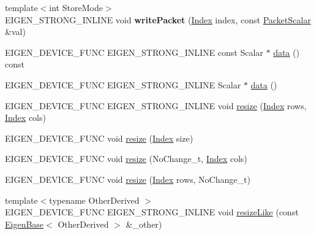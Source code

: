 \begin{DoxyCompactItemize}
\item 
\mbox{\label{class_eigen_1_1_plain_object_base_acda1c761dd92774f7835a0c661f2ef54}} 
{\footnotesize template$<$int Store\+Mode$>$ }\\E\+I\+G\+E\+N\+\_\+\+S\+T\+R\+O\+N\+G\+\_\+\+I\+N\+L\+I\+NE void {\bfseries write\+Packet} (\hyperlink{namespace_eigen_a62e77e0933482dafde8fe197d9a2cfde}{Index} index, const \hyperlink{group___sparse_core___module}{Packet\+Scalar} \&val)
\item 
E\+I\+G\+E\+N\+\_\+\+D\+E\+V\+I\+C\+E\+\_\+\+F\+U\+NC E\+I\+G\+E\+N\+\_\+\+S\+T\+R\+O\+N\+G\+\_\+\+I\+N\+L\+I\+NE const Scalar $\ast$ \hyperlink{class_eigen_1_1_plain_object_base_ac25699535374b1854cf8494e44ad31b2}{data} () const
\item 
E\+I\+G\+E\+N\+\_\+\+D\+E\+V\+I\+C\+E\+\_\+\+F\+U\+NC E\+I\+G\+E\+N\+\_\+\+S\+T\+R\+O\+N\+G\+\_\+\+I\+N\+L\+I\+NE Scalar $\ast$ \hyperlink{class_eigen_1_1_plain_object_base_a54ed64f45b2f5e852355d5e2311810bd}{data} ()
\item 
E\+I\+G\+E\+N\+\_\+\+D\+E\+V\+I\+C\+E\+\_\+\+F\+U\+NC E\+I\+G\+E\+N\+\_\+\+S\+T\+R\+O\+N\+G\+\_\+\+I\+N\+L\+I\+NE void \hyperlink{class_eigen_1_1_plain_object_base_a99d9054ee2d5a40c6e00ded0265e9cea}{resize} (\hyperlink{namespace_eigen_a62e77e0933482dafde8fe197d9a2cfde}{Index} rows, \hyperlink{namespace_eigen_a62e77e0933482dafde8fe197d9a2cfde}{Index} cols)
\item 
E\+I\+G\+E\+N\+\_\+\+D\+E\+V\+I\+C\+E\+\_\+\+F\+U\+NC void \hyperlink{class_eigen_1_1_plain_object_base_abf8a9ec07cd52a2cdabb527596f7ddd1}{resize} (\hyperlink{namespace_eigen_a62e77e0933482dafde8fe197d9a2cfde}{Index} size)
\item 
E\+I\+G\+E\+N\+\_\+\+D\+E\+V\+I\+C\+E\+\_\+\+F\+U\+NC void \hyperlink{class_eigen_1_1_plain_object_base_ab71a655f73d05a0e389e3ed13b6fe5f3}{resize} (No\+Change\+\_\+t, \hyperlink{namespace_eigen_a62e77e0933482dafde8fe197d9a2cfde}{Index} cols)
\item 
E\+I\+G\+E\+N\+\_\+\+D\+E\+V\+I\+C\+E\+\_\+\+F\+U\+NC void \hyperlink{class_eigen_1_1_plain_object_base_a7b44761b7350ae3756035bbf7d7c04f6}{resize} (\hyperlink{namespace_eigen_a62e77e0933482dafde8fe197d9a2cfde}{Index} rows, No\+Change\+\_\+t)
\item 
{\footnotesize template$<$typename Other\+Derived $>$ }\\E\+I\+G\+E\+N\+\_\+\+D\+E\+V\+I\+C\+E\+\_\+\+F\+U\+NC E\+I\+G\+E\+N\+\_\+\+S\+T\+R\+O\+N\+G\+\_\+\+I\+N\+L\+I\+NE void \hyperlink{class_eigen_1_1_plain_object_base_acc7200947e6399bee847ff37c8270fc8}{resize\+Like} (const \hyperlink{group___core___module_struct_eigen_1_1_eigen_base}{Eigen\+Base}$<$ Other\+Derived $>$ \&\+\_\+other)

\end{DoxyCompactItemize}

